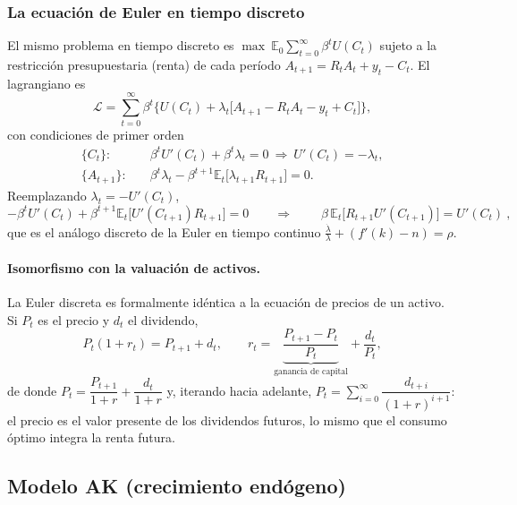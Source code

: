 \documentclass[11pt]{article}
\renewcommand{\boxed}[1]{#1}     %
\theoremstyle{definition}
\newcommand{\E}{\mathbb{E}}
\begin{document}
\subsubsection{La ecuación de Euler en tiempo discreto}

El mismo problema en tiempo discreto es $\max\ \E_{0}\sum_{t=0}^{\infty}\beta^{t}U(C_{t})$ sujeto a la
restricción presupuestaria (renta) de cada período $A_{t+1}=R_{t}A_{t}+y_{t}-C_{t}$. El lagrangiano es
\begin{equation}
\mathcal{L}=\sum_{t=0}^{\infty}\beta^{t}\Big\{U(C_{t})+\lambda_{t}\big[A_{t+1}-R_{t}A_{t}-y_{t}+C_{t}\big]\Big\},
\end{equation}
con condiciones de primer orden
\begin{align}
\{C_{t}\}:\quad & \beta^{t}U'(C_{t})+\beta^{t}\lambda_{t}=0\ \Longrightarrow\ U'(C_{t})=-\lambda_{t},\\
\{A_{t+1}\}:\quad & \beta^{t}\lambda_{t}-\beta^{t+1}\E_{t}\big[\lambda_{t+1}R_{t+1}\big]=0 .
\end{align}
Reemplazando $\lambda_{t}=-U'(C_{t})$,
\begin{equation}
-\beta^{t}U'(C_{t})+\beta^{t+1}\E_{t}\big[U'(C_{t+1})R_{t+1}\big]=0
\qquad\Longrightarrow\qquad
\boxed{\ \beta\,\E_{t}\big[R_{t+1}U'(C_{t+1})\big]=U'(C_{t})\ },
\end{equation}
que es el análogo discreto de la Euler en tiempo continuo $\tfrac{\dot{\lambda}}{\lambda}+(f'(k)-n)=\rho$.

\paragraph{Isomorfismo con la valuación de activos.} La Euler discreta es formalmente idéntica a la
ecuación de precios de un activo. Si $P_{t}$ es el precio y $d_{t}$ el dividendo,
\begin{equation}
P_{t}(1+r_{t})=P_{t+1}+d_{t},
\qquad
r_{t}=\underbrace{\frac{P_{t+1}-P_{t}}{P_{t}}}_{\text{ganancia de capital}}+\frac{d_{t}}{P_{t}},
\end{equation}
de donde $P_{t}=\dfrac{P_{t+1}}{1+r}+\dfrac{d_{t}}{1+r}$ y, iterando hacia adelante,
$P_{t}=\sum_{i=0}^{\infty}\dfrac{d_{t+i}}{(1+r)^{i+1}}$: el precio es el valor presente de los dividendos
futuros, lo mismo que el consumo óptimo integra la renta futura.

\subsection{Modelo AK (crecimiento endógeno)}
\end{document}
